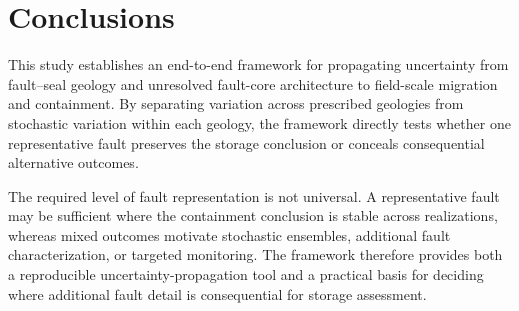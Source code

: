 
\section{Conclusions}

This study establishes an end-to-end framework for propagating uncertainty
from fault--seal geology and unresolved fault-core architecture to
field-scale \coTwo{} migration and containment. By separating variation
across prescribed geologies from stochastic variation within each geology,
the framework directly tests whether one representative fault preserves the
storage conclusion or conceals consequential alternative outcomes.


The required level of fault representation is not universal. A representative
fault may be sufficient where the containment conclusion is stable across
realizations, whereas mixed outcomes motivate stochastic ensembles,
additional fault characterization, or targeted monitoring. The framework
therefore provides both a reproducible uncertainty-propagation tool and a
practical basis for deciding where additional fault detail is consequential
for storage assessment.
